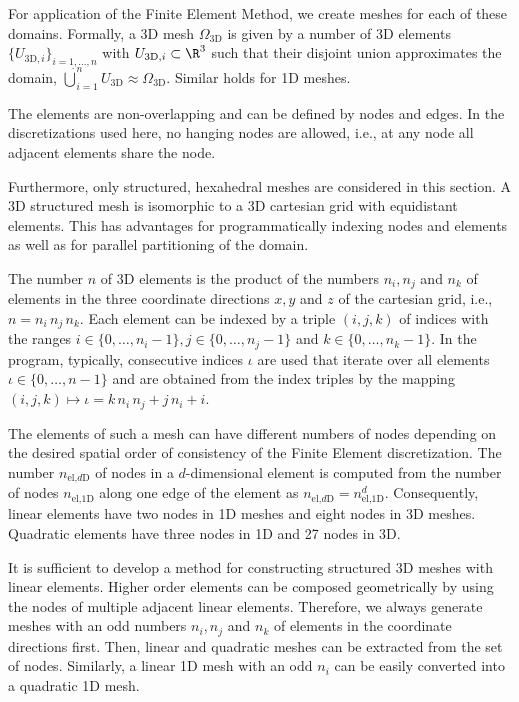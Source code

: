 For application of the Finite Element Method, we create meshes for each of these domains. Formally, a 3D mesh $\Omega_\text{3D}$ is given by a number of 3D elements $\{U_{\text{3D},i}\}_{i=1,\dots,n}$ with $U_{\text{3D},i} \subset \R^3$ such that their disjoint union approximates the domain,
$\dot{\bigcup}_{i=1}^{n} U_\text{3D} \approx \Omega_\text{3D}$. Similar holds for 1D meshes.

The elements are non-overlapping and can be defined by nodes and edges. In the discretizations used here, no hanging nodes are allowed, i.e., at any node all adjacent elements share the node.

Furthermore, only structured, hexahedral meshes are considered in this section.
A 3D structured mesh is isomorphic to a 3D cartesian grid with equidistant elements. 
This has advantages for programmatically indexing nodes and elements as well as for parallel partitioning of the domain.

The number $n$ of 3D elements is the product of the numbers $n_i, n_j$ and $n_k$ of elements in the three coordinate directions $x,y$ and $z$ of the cartesian grid,
 i.e., $n = n_i\,n_j\, n_k$.
Each element can be indexed by a triple $(i,j,k)$ of indices with the ranges $i \in \{0,\dots,n_i-1\}, j \in \{0,\dots, n_j-1\}$ and $k \in \{0,\dots,n_k-1\}$. 
In the program, typically, consecutive indices $\iota$ are used that iterate over all elements $\iota \in \{0,\dots,n-1\}$ and are obtained from the index triples by the mapping 
$(i,j,k) \mapsto \iota = k\,n_i\,n_j + j\,n_i + i$.

The elements of such a mesh can have different numbers of nodes depending on the desired spatial order of consistency of the Finite Element discretization. The number $n_{\text{el,}d\text{D}}$ of nodes in a $d$-dimensional element is computed from the number of nodes $n_{\text{el,1D}}$ along one edge of the element as $n_{\text{el,}d\text{D}} = n_{\text{el,1D}}^d$.
Consequently, linear elements have two nodes in 1D meshes and eight nodes in 3D meshes. Quadratic elements have three nodes in 1D and 27 nodes in 3D.

It is sufficient to develop a method for constructing structured 3D meshes with linear elements. 
Higher order elements can be composed geometrically by using the nodes of multiple adjacent linear elements.
Therefore, we always generate meshes with an odd numbers $n_i,n_j$ and $n_k$ of elements in the coordinate directions first. Then, linear and quadratic meshes can be extracted from the set of nodes. Similarly, a linear 1D mesh with an odd $n_i$ can be easily converted into a quadratic 1D mesh.

